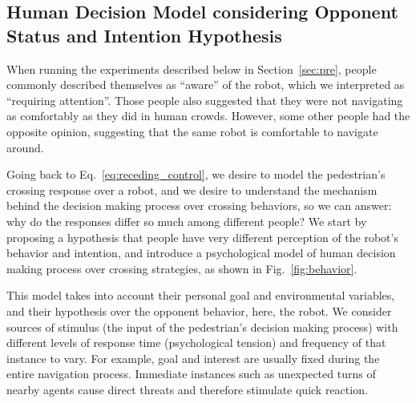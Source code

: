 \documentclass[conference]{IEEEtran}
\begin{document}
\subsection{Human Decision Model considering Opponent Status and Intention Hypothesis}
When running the experiments described below in Section~\ref{sec:pre}, 
people commonly described themselves as ``aware'' of the robot, which we interpreted as 
``requiring attention''. Those people also suggested that they were not navigating as 
comfortably as they did in human crowds. However, some other people had the 
opposite opinion, suggesting that the same robot is comfortable to navigate 
around.

Going back to Eq.~\ref{eq:receding_control}, we desire to model the 
pedestrian's crossing response over a robot, and we desire to understand the 
mechanism behind the decision making process over crossing behaviors, so we 
can answer: why do the responses differ so much among different people? We 
start by proposing a hypothesis that people have very different perception of the 
robot's behavior and intention, and introduce a psychological model of human decision
making process over crossing strategies, as shown in Fig.~\ref{fig:behavior}.

This model takes into account their personal goal and
environmental variables, and their hypothesis over the opponent
behavior, here, the robot. We consider sources of
stimulus (the input of the pedestrian's decision making process) with
different levels of response time (psychological tension) and
frequency of that instance to vary. For example, goal and interest are
usually fixed during the entire navigation process. Immediate
instances such as unexpected turns of nearby agents cause direct
threats and therefore stimulate quick reaction.
\end{document}
